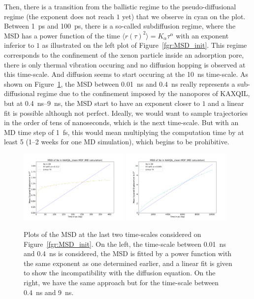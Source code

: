 \documentclass[main]{subfiles}
\begin{document}
Then, there is a transition from the ballistic regime to the pseudo-diffusional regime (the exponent does not reach $1$ yet) that we observe in cyan on the plot. Between \SI{1}{\ps} and \SI{100}{\ps}, there is a so-called subdiffusion regime, where the MSD has a power function of the time $\langle {r(\tau)}^2 \rangle=K_\alpha\tau^\alpha$ with an exponent inferior to $1$ as illustrated on the left plot of Figure~\ref{fgr:MSD_init}. This regime corresponds to the confinement of the xenon particle inside an adsorption pore, there is only thermal vibration occuring and no diffusion hopping is observed at this time-scale. And diffusion seems to start occuring at the \SI{10}{\ns} time-scale. As shown on Figure~\ref{fgr:MSD_linear_init}, the MSD between \SI{0.01}{\ns} and \SI{0.4}{\ns} really represents a sub-diffusional regime due to the confinement imposed by the nanopores of KAXQIL, but at \SI{0.4}{\ns}--\SI{9}{\ns}, the MSD start to have an exponent closer to $1$ and a linear fit is possible although not perfect. Ideally, we would want to sample trajectories in the order of tens of nanoseconds, which is the next time-scale. But with an MD time step of \SI{1}{\fs}, this would mean multiplying the computation time by at least 5 (1--2 weeks for one MD simulation), which begins to be prohibitive. 

\begin{figure}[ht]
  \centering
\includegraphics[width=0.48\textwidth]{figures/5-diffusion/MSD_Xe_coeff_KAXQIL_clean_1.pdf}
\includegraphics[width=0.48\textwidth]{figures/5-diffusion/MSD_Xe_coeff_KAXQIL_clean_2.pdf}
\caption{ Plots of the MSD at the last two time-scales considered on Figure~\ref{fgr:MSD_init}. On the left, the time-scale between \SI{0.01}{\ns} and \SI{0.4}{\ns} is considered, the MSD is fitted by a power function with the same exponent as one determined earlier, and a linear fit is given to show the incompatibility with the diffusion equation. On the right, we have the same approach but for the time-scale between \SI{0.4}{\ns} and \SI{9}{\ns}. }\label{fgr:MSD_linear_init}
\end{figure}
\end{document}
